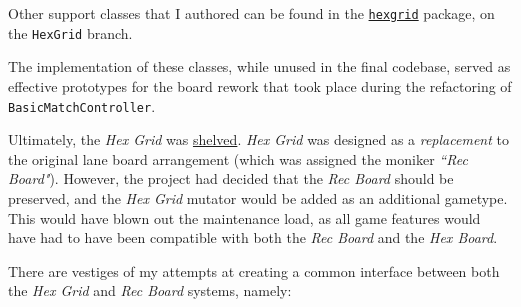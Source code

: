 \documentclass[11pt,a4paper]{report}
\begin{document}
Other support classes that I authored can be found in the \href{https://github.com/UQdeco2800/deco2800-2016-pyramidscheme/tree/HexGrid/pyramidscheme/src/main/java/uq/deco2800/pyramidscheme/hexgrid}{\texttt{hexgrid}} package, on the \texttt{HexGrid} branch.

The implementation of these classes, while unused in the final codebase, served as effective prototypes for the board rework that took place during the refactoring of \texttt{BasicMatchController}.

Ultimately, the \textit{Hex Grid} was \href{https://github.com/UQdeco2800/deco2800-2016-pyramidscheme/issues/14#issuecomment-247825827}{shelved}. \textit{Hex Grid} was designed as a \textit{replacement} to the original lane board arrangement (which was assigned the moniker \textit{``Rec Board"}). However, the project had decided that the \textit{Rec Board} should be preserved, and the \textit {Hex Grid} mutator would be added as an additional gametype. This would have blown out the maintenance load, as all game features would have had to have been compatible with both the \textit{Rec Board} and the \textit {Hex Board}. 

There are vestiges of my attempts at creating a common interface between both the \textit{Hex Grid} and \textit{Rec Board} systems, namely:
\end{document}
